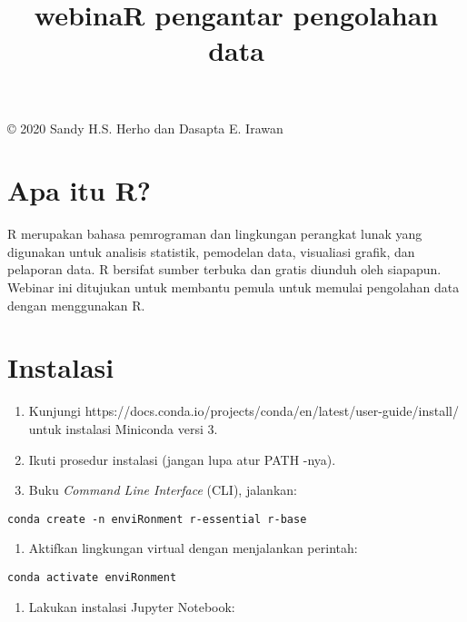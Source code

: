 \documentclass[11pt]{article}
\title{webinaR pengantar pengolahan data}
\providecommand{\tightlist}{%
      \setlength{\itemsep}{0pt}\setlength{\parskip}{0pt}}
\begin{document}
    
    \maketitle
    
    

    
    {©} 2020 \textbar{} Sandy H.S. Herho dan Dasapta E. Irawan

    \hypertarget{apa-itu-r}{%
\section{Apa itu R?}\label{apa-itu-r}}

    R merupakan bahasa pemrograman dan lingkungan perangkat lunak yang
digunakan untuk analisis statistik, pemodelan data, visualiasi grafik,
dan pelaporan data. R bersifat sumber terbuka dan gratis diunduh oleh
siapapun. Webinar ini ditujukan untuk membantu pemula untuk memulai
pengolahan data dengan menggunakan R.

    \hypertarget{instalasi}{%
\section{Instalasi}\label{instalasi}}

    \begin{enumerate}
\def\labelenumi{\arabic{enumi}.}
\tightlist
\item
  Kunjungi
  https://docs.conda.io/projects/conda/en/latest/user-guide/install/
  untuk instalasi Miniconda versi 3.
\item
  Ikuti prosedur instalasi (jangan lupa atur PATH -nya).
\item
  Buku \emph{Command Line Interface} (CLI), jalankan:
\end{enumerate}

\begin{verbatim}
conda create -n enviRonment r-essential r-base
\end{verbatim}

\begin{enumerate}
\def\labelenumi{\arabic{enumi}.}
\setcounter{enumi}{3}
\tightlist
\item
  Aktifkan lingkungan virtual dengan menjalankan perintah:
\end{enumerate}

\begin{verbatim}
conda activate enviRonment
\end{verbatim}

\begin{enumerate}
\def\labelenumi{\arabic{enumi}.}
\setcounter{enumi}{4}
\tightlist
\item
  Lakukan instalasi Jupyter Notebook:
\end{enumerate}
\end{document}
